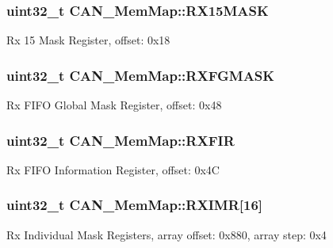\subsubsection[{R\+X15\+M\+A\+S\+K}]{\setlength{\rightskip}{0pt plus 5cm}uint32\+\_\+t C\+A\+N\+\_\+\+Mem\+Map\+::\+R\+X15\+M\+A\+S\+K}\label{struct_c_a_n___mem_map_a4e60a1ec55f8fc14e4cdcd00e922d76d}
Rx 15 Mask Register, offset\+: 0x18 \hypertarget{struct_c_a_n___mem_map_a6b04904e930a16afe225f4b7d55f7101}{}
\subsubsection[{R\+X\+F\+G\+M\+A\+S\+K}]{\setlength{\rightskip}{0pt plus 5cm}uint32\+\_\+t C\+A\+N\+\_\+\+Mem\+Map\+::\+R\+X\+F\+G\+M\+A\+S\+K}\label{struct_c_a_n___mem_map_a6b04904e930a16afe225f4b7d55f7101}
Rx F\+I\+F\+O Global Mask Register, offset\+: 0x48 \hypertarget{struct_c_a_n___mem_map_a0e9b51473b3338ee0e58c54a06eb21f6}{}
\subsubsection[{R\+X\+F\+I\+R}]{\setlength{\rightskip}{0pt plus 5cm}uint32\+\_\+t C\+A\+N\+\_\+\+Mem\+Map\+::\+R\+X\+F\+I\+R}\label{struct_c_a_n___mem_map_a0e9b51473b3338ee0e58c54a06eb21f6}
Rx F\+I\+F\+O Information Register, offset\+: 0x4\+C \hypertarget{struct_c_a_n___mem_map_a49a03dc4c91115ec65f38f9d0fe4a3d3}{}
\subsubsection[{R\+X\+I\+M\+R}]{\setlength{\rightskip}{0pt plus 5cm}uint32\+\_\+t C\+A\+N\+\_\+\+Mem\+Map\+::\+R\+X\+I\+M\+R\mbox{[}16\mbox{]}}\label{struct_c_a_n___mem_map_a49a03dc4c91115ec65f38f9d0fe4a3d3}
Rx Individual Mask Registers, array offset\+: 0x880, array step\+: 0x4 \hypertarget{struct_c_a_n___mem_map_aa788d49d34c42aeb411ed6b43f1a7c42}{}
